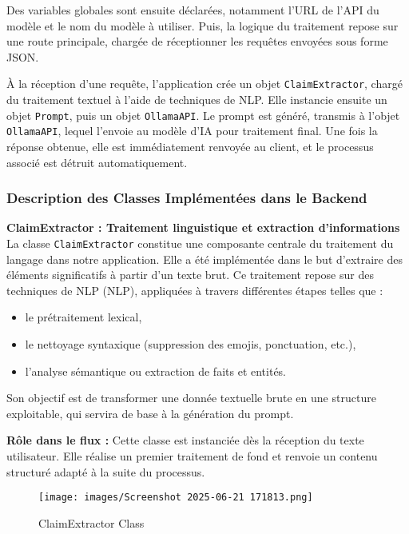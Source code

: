 \begin{description}
\begin{description}
Des variables globales sont ensuite déclarées, notamment l'URL de l'API du modèle et le nom du modèle à utiliser. Puis, la logique du traitement repose sur une route principale, chargée de réceptionner les requêtes envoyées sous forme JSON.

À la réception d'une requête, l'application crée un objet \texttt{ClaimExtractor}, chargé du traitement textuel à l'aide de techniques de NLP. Elle instancie ensuite un objet \texttt{Prompt}, puis un objet \texttt{OllamaAPI}. Le prompt est généré, transmis à l'objet \texttt{OllamaAPI}, lequel l'envoie au modèle d'IA pour traitement final. Une fois la réponse obtenue, elle est immédiatement renvoyée au client, et le processus associé est détruit automatiquement.
\subsubsection*{Description des Classes Implémentées dans le Backend}
\begin{description}
    \item \textbf{ClaimExtractor : Traitement linguistique et extraction d'informations}
La classe \texttt{ClaimExtractor} constitue une composante centrale du traitement du langage dans notre application. Elle a été implémentée dans le but d'extraire des éléments significatifs à partir d'un texte brut. Ce traitement repose sur des techniques de NLP (NLP), appliquées à travers différentes étapes telles que :
\begin{itemize}
    \item le prétraitement lexical,
    \item le nettoyage syntaxique (suppression des emojis, ponctuation, etc.),
    \item l'analyse sémantique ou extraction de faits et entités.
\end{itemize}
Son objectif est de transformer une donnée textuelle brute en une structure exploitable, qui servira de base à la génération du prompt.

\quad \textbullet{} \textbf{Rôle dans le flux :} Cette classe est instanciée dès la réception du texte utilisateur. Elle réalise un premier traitement de fond et renvoie un contenu structuré adapté à la suite du processus.
\begin{itemize}
   

\begin{figure}
    \centering
    \texttt{[image: images/Screenshot 2025-06-21 171813.png]} 
    \caption{ClaimExtractor Class} %
    \label{fig:logos} %
    

\end{figure}
\end{itemize}
\end{description}
\end{description}
\end{description}
